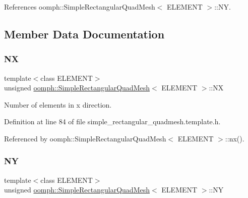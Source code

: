 References oomph\+::\+Simple\+Rectangular\+Quad\+Mesh$<$ E\+L\+E\+M\+E\+N\+T $>$\+::\+NY.



\subsection{Member Data Documentation}
\mbox{\label{classoomph_1_1SimpleRectangularQuadMesh_ab6ec406039698222f051d4ec977f1788}} 
\subsubsection{\texorpdfstring{NX}{NX}}
{\footnotesize\ttfamily template$<$class E\+L\+E\+M\+E\+NT$>$ \\
unsigned \hyperlink{classoomph_1_1SimpleRectangularQuadMesh}{oomph\+::\+Simple\+Rectangular\+Quad\+Mesh}$<$ E\+L\+E\+M\+E\+NT $>$\+::NX\hspace{0.3cm}{\ttfamily [private]}}



Number of elements in x direction. 



Definition at line 84 of file simple\+\_\+rectangular\+\_\+quadmesh.\+template.\+h.



Referenced by oomph\+::\+Simple\+Rectangular\+Quad\+Mesh$<$ E\+L\+E\+M\+E\+N\+T $>$\+::nx().

\mbox{\label{classoomph_1_1SimpleRectangularQuadMesh_a6db96125790b46858fb00eef46bf7201}} 
\subsubsection{\texorpdfstring{NY}{NY}}
{\footnotesize\ttfamily template$<$class E\+L\+E\+M\+E\+NT$>$ \\
unsigned \hyperlink{classoomph_1_1SimpleRectangularQuadMesh}{oomph\+::\+Simple\+Rectangular\+Quad\+Mesh}$<$ E\+L\+E\+M\+E\+NT $>$\+::NY\hspace{0.3cm}{\ttfamily [private]}}



